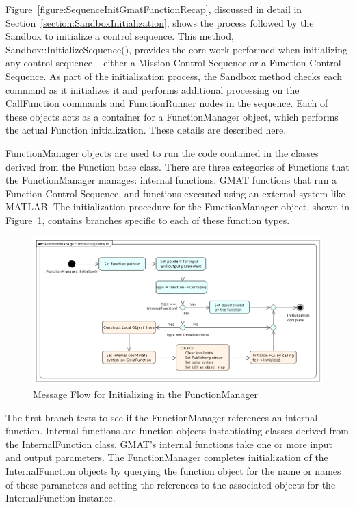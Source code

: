 Figure~\ref{figure:SequenceInitGmatFunctionRecap}, discussed in detail in
Section~\ref{section:SandboxInitialization}, shows the process followed by the Sandbox to
initialize a control sequence.  This method, Sandbox::InitializeSequence(), provides the core
work performed when initializing any control sequence -- either a Mission Control Sequence or a
Function Control Sequence.  As part of the initialization process, the Sandbox method checks each
command as it initializes it and performs additional processing on the CallFunction commands and
FunctionRunner nodes in the sequence.  Each of these objects acts as a container for a
FunctionManager object, which performs the actual Function initialization.  These details are
described here.

FunctionManager objects are used to run the code contained in the classes derived from the Function
base class.  There are three categories of Functions that the FunctionManager manages: internal
functions, GMAT functions that run a Function Control Sequence, and functions executed using an
external system like MATLAB.  The initialization procedure for the FunctionManager object, shown in
Figure~\ref{figure:GmatFunctionInitialization}, contains branches specific to each of these
function types.

\begin{figure}[htb]
\begin{center}
\includegraphics[426,220]{Images/CallFunctionInitializeDetails.png}
\caption{\label{figure:GmatFunctionInitialization}Message Flow for Initializing in the
FunctionManager}
\end{center}
\end{figure}

The first branch tests to see if the FunctionManager references an internal function.  Internal
functions are function objects instantiating classes derived from the InternalFunction class. 
GMAT's internal functions take one or more input and output parameters.  The FunctionManager
completes initialization of the InternalFunction objects by querying the function object for the
name or names of these parameters and setting the references to the associated objects for the
InternalFunction instance.

